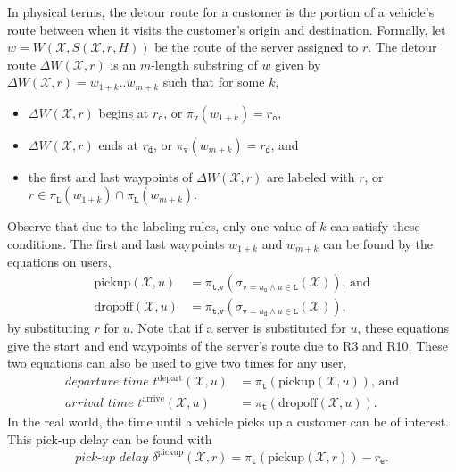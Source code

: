 In physical terms, the detour route for a customer is the portion of a vehicle's
route between when it visits the customer's origin and destination. Formally, let
$w=W(\mathcal{X},S(\mathcal{X},r,H))$ be the route of the server assigned to $r$.
The detour route $\Delta W(\mathcal{X},r)$ is an $m$-length substring of $w$ given by
$\Delta W(\mathcal{X},r)=w_{1+k}..w_{m+k}$ such that for some $k$,
\begin{itemize}
\item $\Delta W(\mathcal{X},r)$ begins at $r_\texttt{o}$, or $\pi_\texttt{v}(w_{1+k})=r_\texttt{o}$,
\item $\Delta W(\mathcal{X},r)$ ends at $r_\texttt{d}$, or $\pi_\texttt{v}(w_{m+k})=r_\texttt{d}$, and
\item the first and last waypoints of $\Delta W(\mathcal{X},r)$ are labeled with $r$, or $r\in\pi_\texttt{L}(w_{1+k})\cap\pi_\texttt{L}(w_{m+k})$.
\end{itemize}
Observe that due to the labeling rules, only one value of $k$ can satisfy these
conditions. The first and last waypoints $w_{1+k}$ and $w_{m+k}$ can be found by
the equations on users,
\begin{align}
\label{eq:pickup}
\textrm{pickup}(\mathcal{X},u)&=\pi_{\texttt{t},\texttt{v}}(\sigma_{\texttt{v}=u_\texttt{o}\land u\in\texttt{L}}(\mathcal{X}))\textrm{, and}\\
\label{eq:dropoff}
\textrm{dropoff}(\mathcal{X},u)&=\pi_{\texttt{t},\texttt{v}}(\sigma_{\texttt{v}=u_\texttt{d}\land u\in\texttt{L}}(\mathcal{X})),
\end{align}
by substituting $r$ for $u$.
Note that if a server is substituted for $u$, these equations give the start and
end waypoints of the server's route due to R3 and R10.
These two equations can also be used to give two times for
any user,
\begin{align}
\label{eq:departure-time}
\textit{departure time }t^\textrm{depart}(\mathcal{X},u)&=\pi_\texttt{t}(\textrm{pickup}(\mathcal{X},u))\textrm{, and}\\
\label{eq:arrival-time}
\textit{arrival time }t^\textrm{arrive}(\mathcal{X},u)&=\pi_\texttt{t}(\textrm{dropoff}(\mathcal{X},u)).
\end{align}
In the real world, the time until a vehicle picks up a customer can be of interest.
This pick-up delay can be found with
\begin{equation}
\label{eq:pick-up delay}
\textit{pick-up delay }\delta^\textrm{pickup}(\mathcal{X},r)=\pi_\texttt{t}(\textrm{pickup}(\mathcal{X},r))-r_\texttt{e}.
\end{equation}

